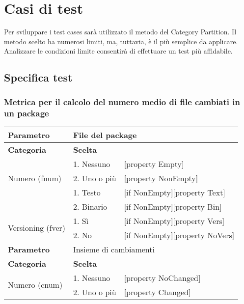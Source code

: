 \chapter{Casi di test}
Per sviluppare i test cases sarà utilizzato il metodo del Category Partition. Il metodo scelto ha numerosi limiti, ma, tuttavia, è il più semplice da applicare. Analizzare le condizioni limite consentirà di effettuare un test più affidabile.

\section{Specifica test}

\subsection{Metrica per il calcolo del numero medio di file cambiati in un package}

\begin{tabular}{|p{4cm}|p{4cm}p{5cm}|}
	\hline
	\cellcolor{Gray} \textbf{Parametro}				& \multicolumn{2}{l|}{File del package}							\tabularnewline
	\hline
	\rowcolor{Gray}
	\textbf{Categoria}						& \textbf{Scelta}			&						\tabularnewline
	\hline
	\multirow{3}{*}{Numero (fnum)}					& 1. Nessuno				&	[property Empty] 			\tabularnewline
									\cline{2-3}
									& 2. Uno o più				&	[property NonEmpty]			\tabularnewline
	\hline
	\multirow{2}{*}{Tipo (ftype)}					& 1. Testo				&	[if NonEmpty][property Text] 		\tabularnewline
									\cline{2-3}
									& 2. Binario				&	[if NonEmpty][property Bin]		\tabularnewline
	\hline
	\multirow{2}{*}{Versioning (fver)}				& 1. Sì					&	[if NonEmpty][property Vers] 		\tabularnewline
									\cline{2-3}
									& 2. No					&	[if NonEmpty][property NoVers]		\tabularnewline
	\hline
	
	\cellcolor{Gray} \textbf{Parametro}				& \multicolumn{2}{l|}{Insieme di cambiamenti}						\tabularnewline
	\hline
	\rowcolor{Gray}
	\textbf{Categoria}						& \textbf{Scelta}			&						\tabularnewline
	\hline
	\multirow{3}{*}{Numero (cnum)}					& 1. Nessuno				&	[property NoChanged] 			\tabularnewline
									\cline{2-3}
									& 2. Uno o più				&	[property Changed]			\tabularnewline

	\hline
\end{tabular}

\vspace{1cm}

